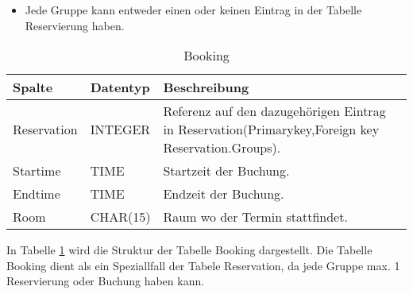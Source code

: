 \documentclass[10pt,a4paper]{article}
\begin{document}
\begin{itemize}
	\item Jede Gruppe kann entweder einen oder keinen Eintrag in der Tabelle Reservierung haben. 
\end{itemize}

\begin{table}[h]
\centering
\caption{Booking}
	\label{tab:Booking}
    \begin{tabular}{| l | l | l | l |}
    \hline
    \rowcolor{lightgray} Spalte & Datentyp & Beschreibung  \\ \hline
    Reservation  & INTEGER & Referenz auf den dazugehörigen Eintrag in Reservation(Primarykey,Foreign key Reservation.Groups). \\ \hline
    Startime & TIME & Startzeit der Buchung. \\ \hline
    Endtime & TIME & Endzeit der Buchung. \\ \hline
    Room & CHAR(15) & Raum wo der Termin stattfindet. \\ \hline
    \end{tabular}
\end{table}

In Tabelle \ref{tab:Booking} wird die Struktur der Tabelle Booking dargestellt. Die Tabelle Booking dient als ein Speziallfall der Tabele Reservation, da jede Gruppe max. 1 Reservierung oder Buchung haben kann.
\end{document}
